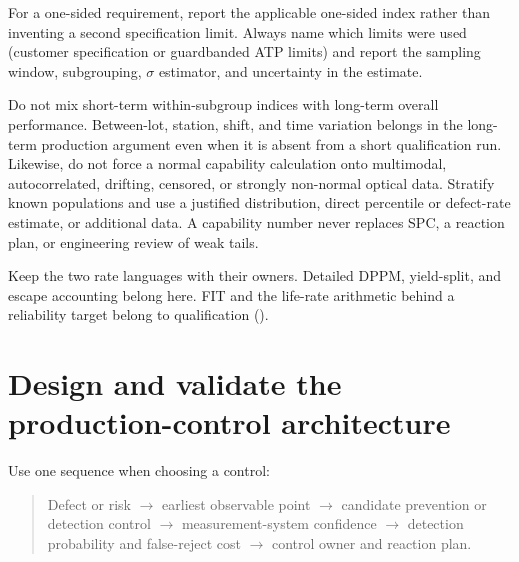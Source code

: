 For a one-sided requirement, report the applicable one-sided index rather than
inventing a second specification limit. Always name which limits were used
(customer specification or guardbanded ATP limits) and report the sampling
window, subgrouping, $\sigma$ estimator, and uncertainty in the estimate.

Do not mix short-term within-subgroup indices with long-term overall
performance. Between-lot, station, shift, and time variation belongs in the
long-term production argument even when it is absent from a short qualification
run. Likewise, do not force a normal capability calculation onto multimodal,
autocorrelated, drifting, censored, or strongly non-normal optical data.
Stratify known populations and use a justified distribution, direct percentile
or defect-rate estimate, or additional data. A capability number never replaces
SPC, a reaction plan, or engineering review of weak tails.

Keep the two rate languages with their owners. Detailed DPPM, yield-split, and
escape accounting belong here. FIT and the life-rate arithmetic behind a
reliability target belong to qualification ().

\section{Design and validate the production-control architecture}
\label{sec:hvm-test}


Use one sequence when choosing a control:

\begin{quote}
\noindent Defect or risk
$\rightarrow$ earliest observable point
$\rightarrow$ candidate prevention or detection control
$\rightarrow$ measurement-system confidence
$\rightarrow$ detection probability and false-reject cost
$\rightarrow$ control owner and reaction plan.
\end{quote}

